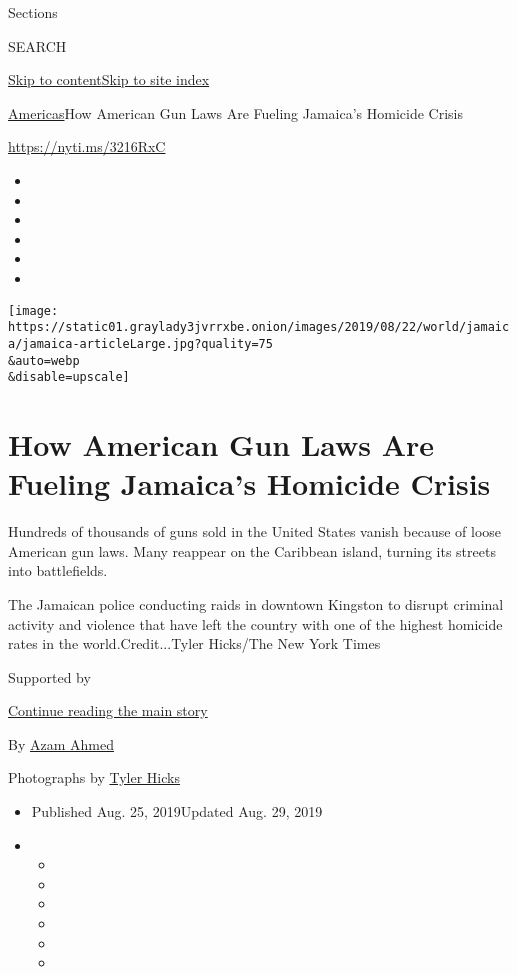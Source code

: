 Sections

SEARCH

\protect\hyperlink{site-content}{Skip to
content}\protect\hyperlink{site-index}{Skip to site index}

\href{/section/world/americas}{Americas}\textbar{}How American Gun Laws
Are Fueling Jamaica's Homicide Crisis

\url{https://nyti.ms/3216RxC}

\begin{itemize}
\item
\item
\item
\item
\item
\item
\end{itemize}

\texttt{[image: https://static01.graylady3jvrrxbe.onion/images/2019/08/22/world/jamaica/jamaica-articleLarge.jpg?quality=75\\\&auto=webp\\\&disable=upscale]}

\hypertarget{how-american-gun-laws-are-fueling-jamaicas-homicide-crisis}{%
\section{How American Gun Laws Are Fueling Jamaica's Homicide
Crisis}\label{how-american-gun-laws-are-fueling-jamaicas-homicide-crisis}}

Hundreds of thousands of guns sold in the United States vanish because
of loose American gun laws. Many reappear on the Caribbean island,
turning its streets into battlefields.

The Jamaican police conducting raids in downtown Kingston to disrupt
criminal activity and violence that have left the country with one of
the highest homicide rates in the world.Credit...Tyler Hicks/The New
York Times

Supported by

\protect\hyperlink{after-sponsor}{Continue reading the main story}

By \href{https://www.nytimes3xbfgragh.onion/by/azam-ahmed}{Azam Ahmed}

Photographs by
\href{https://www.nytimes3xbfgragh.onion/by/tyler-hicks}{Tyler Hicks}

\begin{itemize}
\item
  Published Aug. 25, 2019Updated Aug. 29, 2019
\item
  \begin{itemize}
  \item
  \item
  \item
  \item
  \item
  \item
  \end{itemize}
\end{itemize}

